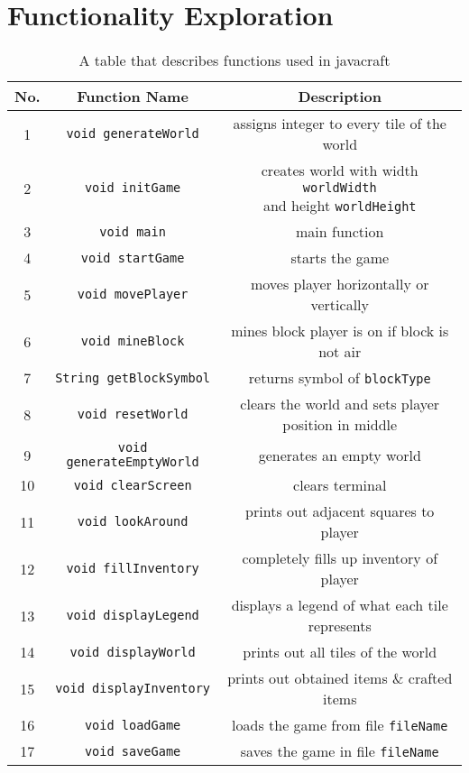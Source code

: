 \section{Functionality Exploration} \label{section: functionality exploration}

\begin{table}[ht]
    \centering
    \caption{A table that describes functions used in javacraft}
    \begin{tabular}{ccc}
    \toprule
    \textbf{No.}&\textbf{Function Name}&\textbf{Description}\\
    \midrule
    1& \texttt{void generateWorld} & assigns integer to every tile of the world\\
    2& \texttt{void initGame} & \makecell{creates world with width \texttt{worldWidth} \\and height \texttt{worldHeight}}\\
    3& \texttt{void main} & main function\\
    4& \texttt{void startGame} & starts the game\\
    5& \texttt{void movePlayer} & moves player horizontally or vertically\\
    6& \texttt{void mineBlock} & mines block player is on if block is not air\\
    7& \texttt{String getBlockSymbol} & returns symbol of \texttt{blockType}\\
    8& \texttt{void resetWorld} & clears the world and sets player position in middle\\
    9& \texttt{void generateEmptyWorld} & generates an empty world\\
    10& \texttt{void clearScreen} & clears terminal\\
    11& \texttt{void lookAround} & prints out adjacent squares to player\\
    12& \texttt{void fillInventory} & completely fills up inventory of player\\
    13& \texttt{void displayLegend} & displays a legend of what each tile represents\\
    14& \texttt{void displayWorld} & prints out all tiles of the world\\
    15& \texttt{void displayInventory} & prints out obtained items \& crafted items\\
    16& \texttt{void loadGame} & loads the game from file \texttt{fileName}\\
    17& \texttt{void saveGame} & saves the game in file \texttt{fileName}\\

\end{tabular}
\end{table}

